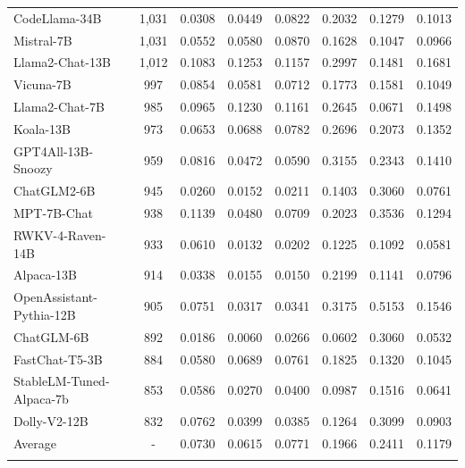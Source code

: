 \begin{table}[!t]
{\begin{tabular}{l|c|cccc|c|c}
CodeLlama-34B   &    1,031  & 0.0308 & 0.0449 & 0.0822 & 0.2032 & 0.1279 & 0.1013 \\
Mistral-7B~\cite{jiang2023mistral} & 1,031 & 0.0552 & 0.0580 & 0.0870 & 0.1628 & 0.1047 & 0.0966
\\
Llama2-Chat-13B~\cite{touvron2023llama2} & 1,012 & 0.1083 & 0.1253 & 0.1157 & 0.2997 & 0.1481 & 0.1681
\\
Vicuna-7B~\cite{zheng2023judging}                &  997   &  0.0854 & 0.0581 & 0.0712 & 0.1773 & 0.1581 & 0.1049
                 \\
Llama2-Chat-7B~\cite{touvron2023llama2} &  985 & 0.0965 & 0.1230 & 0.1161 & 0.2645 & 0.0671 & 0.1498
 \\
Koala-13B~\cite{koala_blogpost_2023}                &  973    & 0.0653 & 0.0688 & 0.0782 & 0.2696 & 0.2073 & 0.1352
 \\
GPT4All-13B-Snoozy~\cite{gpt4all}       &  959    & 0.0816 & 0.0472 & 0.0590 & 0.3155 & 0.2343 & 0.1410  \\
ChatGLM2-6B~\cite{zeng2022glm} & 945 & 0.0260 & 0.0152 & 0.0211 & 0.1403 & 0.3060 & 0.0761 \\
MPT-7B-Chat~\cite{MosaicML2023Introducing}              &  938    & 0.1139 & 0.0480 & 0.0709 & 0.2023 & 0.3536 & 0.1294      \\
RWKV-4-Raven-14B~\cite{peng2023rwkv}         &  933    & 0.0610 & 0.0132 & 0.0202 & 0.1225 & 0.1092 & 0.0581 \\
Alpaca-13B~\cite{alpaca}               &  914    & 0.0338 & 0.0155 & 0.0150 & 0.2199 & 0.1141 & 0.0796  \\
OpenAssistant-Pythia-12B~\cite{kopf2023openassistant} &  905    & 0.0751 & 0.0317 & 0.0341 & 0.3175 & 0.5153 & 0.1546  \\
ChatGLM-6B~\cite{zeng2022glm}               &  892    & 0.0186 & 0.0060 & 0.0266 & 0.0602 & 0.3060 & 0.0532        \\
FastChat-T5-3B~\cite{zheng2023judging}           &  884    & 0.0580 & 0.0689 & 0.0761 & 0.1825 & 0.1320 & 0.1045   \\
StableLM-Tuned-Alpaca-7b~\cite{stablelm} &  853    & 0.0586 & 0.0270 & 0.0400 & 0.0987 & 0.1516 & 0.0641
 \\
Dolly-V2-12B~\cite{DatabricksBlog2023DollyV2}             &  832    & 0.0762 & 0.0399 & 0.0385 & 0.1264 & 0.3099 & 0.0903 \\ \midrule
Average       & -  & 0.0730 & 0.0615 & 0.0771 & 0.1966 & 0.2411 & 0.1179 \\ \Xhline{1.0pt}
\end{tabular}
}
\label{tab:dipia-rslt}
\end{table}

